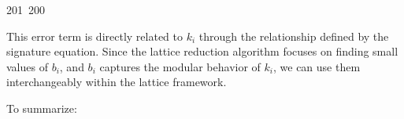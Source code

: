 201~200~\documentclass{article}
\begin{document}
	                                                                        	                                                                    	                                	                    	                    	                        	                        	                    	                                                                	                	                                                                    	                    							This error term is directly related to $k_i$ through the relationship defined by the signature equation. Since the lattice reduction algorithm focuses on finding small values of $b_i$, and $b_i$ captures the modular behavior of $k_i$, we can use them interchangeably within the lattice framework.

	                                                                        	                                                                    	                                	                    	                    	                        	                        	                    	                                                                	                	                                                                    	                    							To summarize:
\end{document}
